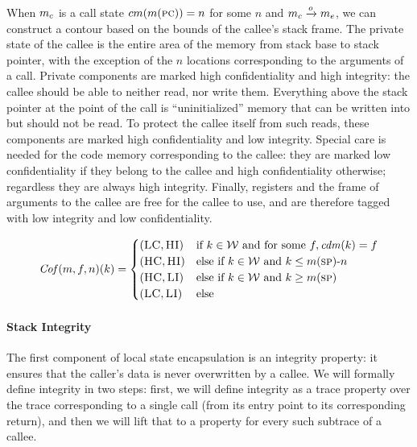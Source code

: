 \documentclass[acmsmall,review,anonymous]{acmart}\settopmatter{printfolios=true,printccs=false,printacmref=false}
\begin{document}
When \(m_c\) is a call state \(cm(m(\textsc{pc})) = n\) for
some \(n\) and \(m_c \xrightarrow{o} m_e\), we can construct
a contour based on the bounds of the callee's stack frame.
%
The private state of the callee is the entire area of the memory from
stack base to stack pointer, with the exception of the $n$ locations
corresponding to the arguments of a call. Private components are
marked high confidentiality and high integrity: the callee should be
able to neither read, nor write them.
%
Everything above the stack pointer at the point of the call is
``uninitialized'' memory that can be written into but should not be
read. To protect the callee itself from such reads, these components
are marked high confidentiality and low integrity.
%
Special care is needed for the code memory corresponding to the
callee: they are marked low confidentiality if they belong to the
callee and high confidentiality otherwise; regardless they are always
high integrity.
%
Finally, registers and the frame of arguments to the callee are free
for the callee to use, and are therefore tagged with low integrity and
low confidentiality.

 \[\mathit{Cof}(m,f,n)(k) =
  \begin{cases}
    (\textsc{LC},\textsc{HI}) & \text{if } k \in {\mathcal W}
                         \text{ and for some } f, \mathit{cdm}(k) = f \\
    (\textsc{HC},\textsc{HI}) & \text{else if } k \in {\mathcal W}
                          \text{ and } k \leq m(\textsc{sp}) \textrm{-}  n \\
    (\textsc{HC},\textsc{LI}) & \text{else if } k \in {\mathcal W}
                         \text{ and } k \geq m(\textsc{sp}) \\
    (\textsc{LC},\textsc{LI}) & \text{else} \\
  \end{cases}\]


\paragraph*{Stack Integrity}

The first component of local state encapsulation is an integrity
property: it ensures that the caller's data is never overwritten by a
callee. We will formally define integrity in two steps: first, we will
define integrity as a trace property over the trace corresponding to a
single call (from its entry point to its corresponding return), and
then we will lift that to a property for every such subtrace of a
callee.
\end{document}
